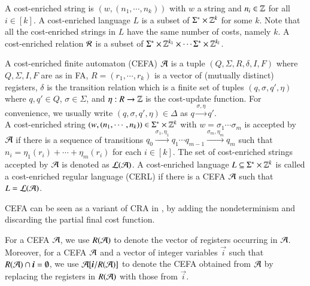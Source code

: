 \documentclass{llncs}
\begin{document}

A cost-enriched string is $(w, (n_1, \cdots, n_k))$ with $w$  a string and $n_i \in \mathbb{Z}$ for all $i \in [k]$. 
A cost-enriched language $L$ is a subset of $\Sigma^* \times \mathbb{Z}^k$ for some $k$. Note that all the cost-enriched strings in $L$ have the same number of costs, namely $k$.
A cost-enriched relation $\mathcal{R}$ is a subset of $\Sigma^* \times \mathbb{Z}^{k_1} \times \cdots \Sigma^* \times \mathbb{Z}^{k_l}$.

\begin{definition}
A cost-enriched finite automaton (CEFA) $\mathcal{A}$ is a tuple $(Q, \Sigma, R, \delta, I, F)$ where $Q, \Sigma, I, F$ are as in FA, $R=(r_1, \cdots, r_k)$ is a vector of (mutually distinct) registers, $\delta$ is the transition relation which is a finite set of tuples $(q, \sigma, q', \eta)$ where $q, q' \in Q$, $\sigma \in \Sigma$, and $\eta: R \rightarrow \mathbb{Z}$ is the cost-update function. For convenience, we usually write $(q, \sigma, q', \eta) \in \Delta$ as $q \xrightarrow{\sigma, \eta} q'$.
\\
A cost-enriched string $(w, (n_1, \cdots,n_k)) \in \Sigma^* \times \mathbb{Z}^k$ with $w=\sigma_1 \cdots \sigma_m$ is accepted by $\mathcal{A}$ if there is a sequence of transitions $q_0 \xrightarrow{\sigma_1, \eta_1} q_1 \cdots q_{m-1} \xrightarrow{\sigma_m, \eta_m} q_m$ such that $n_i = \eta_1(r_i) + \cdots + \eta_m(r_i)$ for each $i \in [k]$. The set of cost-enriched strings accepted by $\mathcal{A}$ is denoted as $\mathcal{L}(\mathcal{A})$. A cost-enriched language $L \subseteq \Sigma^* \times \mathbb{Z}^k$ is called a cost-enriched regular language (CERL) if there is a CEFA $\mathcal{A}$ such that $L = \mathcal{L}(\mathcal{A})$.
\end{definition}
CEFA can be seen as a variant of CRA in \cite{RLJ+13}, by adding the nondeterminism and discarding the partial final cost function. 

For a CEFA $\mathcal{A}$, we use $R(\mathcal{A})$ to denote the vector of registers occurring in $\mathcal{A}$. Moreover, for a CEFA $\mathcal{A}$ and a vector of integer variables $\vec{i}$ such that $R(\Aut) \cap \vec{i} = \emptyset$, we use $\Aut[\vec{i}/R(\Aut)]$ to denote the CEFA obtained from $\mathcal{A}$ by replacing the registers in $R(\mathcal{A})$ with those from $\vec{i}$. 

\end{document}
